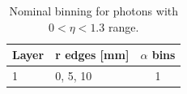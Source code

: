 \begin{frame}[t]
\begin{table}[h]
\centering
\caption{Nominal binning for photons with $0 < \eta < 1.3$ range.}
\label{tab:d1-binning}
\begin{tabular}{l|l|c}
\toprule
Layer & r edges [mm] & $\alpha$ bins  \\ \midrule
1 & 0, 5, 10 & 1 \\
\bottomrule
\end{tabular}
\end{table}

\end{frame}


